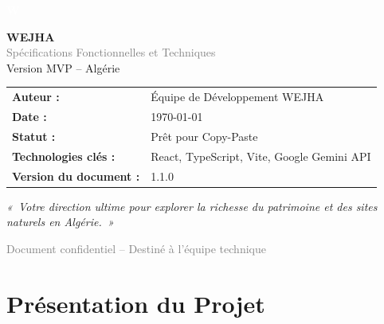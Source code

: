 \documentclass[11pt,a4paper]{article}
\begin{document}
\begin{titlepage}
    \centering
    \vspace*{1.5cm}
    
    \begin{tcolorbox}[colback=wejhaprimary,colframe=wejhaprimary,arc=15pt,halign=center,width=4cm]
        \textcolor{white}{\Huge\textbf{W}}
    \end{tcolorbox}
    
    \vspace{1cm}
    \textcolor{wejhaprimary}{\Huge \textbf{WEJHA}}\\
    \vspace{0.4cm}
    \textcolor{gray}{\Large Spécifications Fonctionnelles et Techniques}\\
    \vspace{0.2cm}
    \textcolor{wejhaaccent}{\large Version MVP -- Algérie}
    
    \vspace{2.5cm}
    
    \begin{tcolorbox}[colback=wejhabg, colframe=wejhaprimary, title=Informations du Projet, arc=8pt]
        \begin{tabular}{ll}
            \textbf{Auteur :} & Équipe de Développement WEJHA \\
            \textbf{Date :} & \today \\
            \textbf{Statut :} & Prêt pour Copy-Paste \\
            \textbf{Technologies clés :} & React, TypeScript, Vite, Google Gemini API \\
            \textbf{Version du document :} & 1.1.0
        \end{tabular}
    \end{tcolorbox}
    
    \vspace{3cm}
    
    \textcolor{wejhadark}{\large\textit{«~Votre direction ultime pour explorer la richesse du patrimoine et des sites naturels en Algérie.~»}}
    
    \vfill
    
    \textcolor{gray}{\small Document confidentiel -- Destiné à l'équipe technique}
\end{titlepage}

\newpage
\tableofcontents
\newpage

\section{Présentation du Projet}
\end{document}
